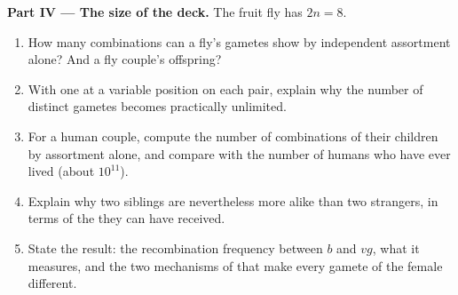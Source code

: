 \begin{problem}
\medskip
\noindent\textbf{Part IV --- The size of the deck.}
The fruit fly has $2n = 8$.
\begin{enumerate}[resume]
  \item How many  combinations can a fly's gametes show by
        independent assortment alone? And a fly couple's offspring?
  \item With one  at a variable position on each pair,
        explain why the number of distinct gametes becomes practically
        unlimited.
  \item For a human couple, compute the number of 
        combinations of their children by assortment alone, and
        compare with the number of humans who have ever lived (about
        $10^{11}$).
  \item Explain why two siblings are nevertheless more alike than two
        strangers, in terms of the  they can have received.
  \item State the result: the recombination frequency between $b$ and
        $vg$, what it measures, and the two mechanisms of  that
        make every gamete of the female different.
\end{enumerate}
\end{problem}
